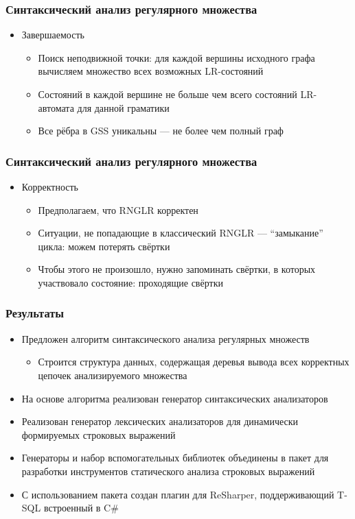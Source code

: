 \documentclass{beamer}
\begin{document}
\begin{frame}[fragile]
	\transwipe[direction=90]
	\frametitle{Синтаксический анализ регулярного множества}
  \begin{itemize}
  \item Завершаемость
    \begin{itemize}
      \item Поиск неподвижной точки: для каждой вершины исходного графа вычисляем множество всех возможных LR-состояний
      \item Состояний в каждой вершине не больше чем всего состояний LR-автомата для данной граматики
      \item Все рёбра в GSS уникальны --- не более чем полный граф
    \end{itemize}
\end{itemize}
\end{frame}

\begin{frame}[fragile]
	\transwipe[direction=90]
	\frametitle{Синтаксический анализ регулярного множества}
  \begin{itemize}
  \item Корректность
    \begin{itemize}
      \item Предполагаем, что RNGLR корректен
      \item Ситуации, не попадающие в классический RNGLR --- ``замыкание'' цикла: можем потерять свёртки
      \item Чтобы этого не произошло, нужно запоминать свёртки, в которых участвовало состояние: проходящие свёртки
    \end{itemize}
\end{itemize}
\end{frame}

		   
\begin{frame}[fragile]
	\transwipe[direction=90]
	\frametitle{Результаты}
	\begin{itemize}
	    \item Предложен алгоритм синтаксического анализа регулярных множеств
	    \begin{itemize}
	        \item Строится структура данных, содержащая деревья вывода всех корректных цепочек анализируемого множества
    	\end{itemize}
    	\item На основе алгоритма реализован генератор синтаксических анализаторов
    	\item Реализован генератор лексических анализаторов для динамически формируемых строковых выражений
      \item Генераторы и набор вспомогательных библиотек объединены в пакет для разработки инструментов статического анализа строковых выражений
	    \item С использованием пакета создан плагин для ReSharper, поддерживающий T-SQL встроенный в C\#
	\end{itemize}
\end{frame}
\end{document}

